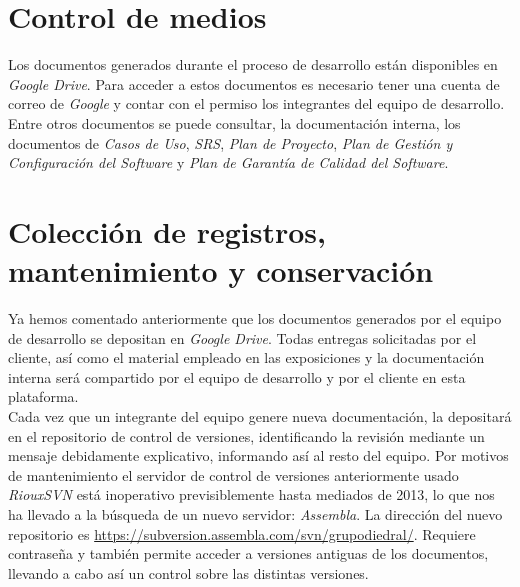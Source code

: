 \documentclass[11pt, a4paper, twoside, titlepage]{article}
\begin{document}
	\section{Control de medios} %
		Los documentos generados durante el proceso de desarrollo están disponibles en \textit{Google Drive}. Para acceder a estos documentos es necesario tener una cuenta de correo de \textit{Google} %
 y contar con el permiso los integrantes del equipo de desarrollo.\\

		Entre otros documentos se puede consultar, la documentación interna, los documentos de \textit{Casos de Uso}, \textit{SRS}, \textit{Plan de Proyecto}, \textit{Plan de Gestión y Configuración del Software} y \textit{Plan de Garantía de Calidad del Software}.


	\section{Colección de registros, mantenimiento y conservación} %
		Ya hemos comentado anteriormente que los documentos generados por el equipo de desarrollo se depositan en \textit{Google Drive}. Todas entregas solicitadas por el cliente, así como el material empleado en las exposiciones y la documentación interna será compartido por el equipo de desarrollo y por el cliente en esta plataforma. \\

		Cada vez que un integrante del equipo genere nueva documentación, la depositará en el repositorio de control de versiones,  identificando la revisión mediante un mensaje debidamente explicativo, informando así al resto del equipo. Por motivos de mantenimiento el servidor de control de versiones anteriormente usado \textit{RiouxSVN} está inoperativo previsiblemente hasta mediados de 2013, lo que nos ha llevado a la búsqueda de un nuevo servidor: \textit{Assembla}. La dirección del nuevo repositorio es \url{https://subversion.assembla.com/svn/grupodiedral/}. Requiere contraseña y también permite acceder a versiones antiguas de los documentos, llevando a cabo así un control sobre las distintas versiones.
\end{document}
